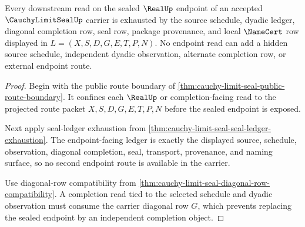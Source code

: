 \begin{theorem}
\label{thm:cauchy-limit-seal-sealed-endpoint-route-exhaustion}
Every downstream read on the sealed $\RealUp$ endpoint of an accepted $\CauchyLimitSealUp$ carrier is exhausted by the source schedule, dyadic ledger, diagonal completion row, seal row, package provenance, and local $\NameCert$ row displayed in $L=(X,S,D,G,E,T,P,N)$. No endpoint read can add a hidden source schedule, independent dyadic observation, alternate completion row, or external endpoint route.
\end{theorem}
\begin{proof}
Begin with the public route boundary of \autoref{thm:cauchy-limit-seal-public-route-boundary}. It confines each $\RealUp$ or completion-facing read to the projected route packet $X,S,D,G,E,T,P,N$ before the sealed endpoint is exposed.

Next apply seal-ledger exhaustion from \autoref{thm:cauchy-limit-seal-seal-ledger-exhaustion}. The endpoint-facing ledger is exactly the displayed source, schedule, observation, diagonal completion, seal, transport, provenance, and naming surface, so no second endpoint route is available in the carrier.

Use diagonal-row compatibility from \autoref{thm:cauchy-limit-seal-diagonal-row-compatibility}. A completion read tied to the selected schedule and dyadic observation must consume the carrier diagonal row $G$, which prevents replacing the sealed endpoint by an independent completion object.
\end{proof}

